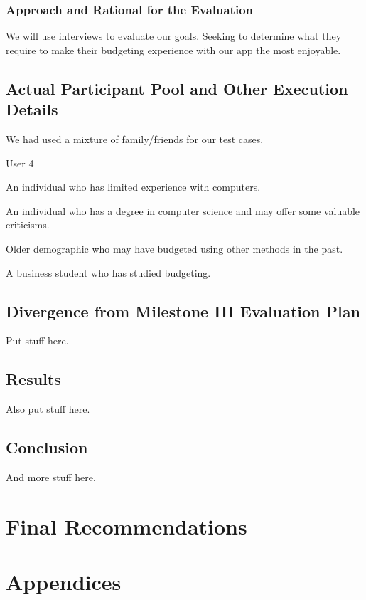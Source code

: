 \documentclass{chi2011}
\begin{document}
		\subsubsection{Approach and Rational for the Evaluation}

		We will use interviews to evaluate our goals. Seeking to determine what they require to make their
		budgeting experience with our app the most enjoyable.


	\subsection{Actual Participant Pool and Other Execution Details}

	We had used a mixture of family/friends for our test cases. 

	\begin{labeling}{User 4}
		\item [User 1] An individual who has limited experience with computers.  
		\item [User 2] An individual who has a degree in computer science and may offer some valuable 
		criticisms. 
		\item [User 3] Older demographic who may have budgeted using other methods in the past.
		\item [User 4] A business student who has studied budgeting.
	\end{labeling}


	\subsection{Divergence from Milestone III Evaluation Plan}

	Put stuff here.


	\subsection{Results}

	Also put stuff here.


	\subsection{Conclusion}

	And more stuff here.

\section{Final Recommendations}

\section{Appendices}



\end{document}
